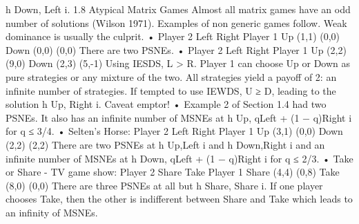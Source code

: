 h Down, Left i.
1.8 Atypical Matrix Games
Almost all matrix games have an odd number of solutions (Wilson 1971). Examples of
non generic games follow. Weak dominance is usually the culprit.
•
Player 2
Left Right
Player 1 Up (1,1) (0,0)
Down (0,0) (0,0)
There are two PSNEs.
•
Player 2
Left Right
Player 1 Up (2,2) (9,0)
Down (2,3) (5,-1)
Using IESDS, L > R. Player 1 can choose Up or Down as pure strategies or any
mixture of the two. All strategies yield a payoff of 2: an infinite number of strategies.
If tempted to use IEWDS, U ≥ D, leading to the solution h Up, Right i. Caveat
emptor!
• Example 2 of Section 1.4 had two PSNEs. It also has an infinite number of MSNEs
at h Up, qLeft + (1 − q)Right i for q ≤ 3/4.
• Selten’s Horse:
Player 2
Left Right
Player 1 Up (3,1) (0,0)
Down (2,2) (2,2)
There are two PSNEs at h Up,Left i and h Down,Right i and an infinite number of
MSNEs at h Down, qLeft + (1 − q)Right i for q ≤ 2/3.
• Take or Share - TV game show:
Player 2
Share Take
Player 1 Share (4,4) (0,8)
Take (8,0) (0,0)
There are three PSNEs at all but h Share, Share i. If one player chooses Take, then
the other is indifferent between Share and Take which leads to an infinity of MSNEs.
